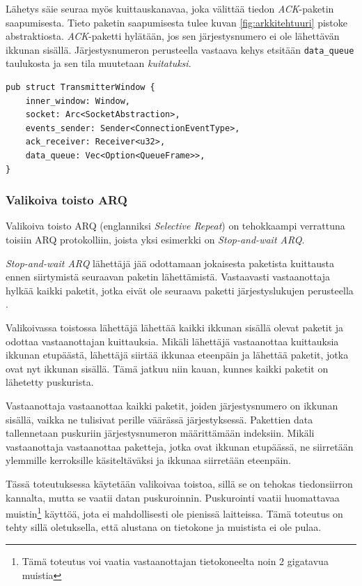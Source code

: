 \documentclass[a4paper,12pt]{article}
\begin{document}
Lähetys säie seuraa myös kuittauskanavaa, joka välittää tiedon \textit{ACK}-paketin saapumisesta. Tieto paketin saapumisesta tulee kuvan \ref{fig:arkkitehtuuri} pistoke abstraktiosta. \textit{ACK}-paketti hylätään, jos sen järjestysnumero ei ole lähettävän ikkunan sisällä. Järjestysnumeron perusteella vastaava kehys etsitään \lstinline{data_queue} taulukosta ja sen tila muutetaan \textit{kuitatuksi}. \par
    
    \begin{lstlisting}[caption={Lähettävän ikkunan rakenne}, label={lst:twindow}]
pub struct TransmitterWindow {
    inner_window: Window,
    socket: Arc<SocketAbstraction>,
    events_sender: Sender<ConnectionEventType>,
    ack_receiver: Receiver<u32>,
    data_queue: Vec<Option<QueueFrame>>,
}\end{lstlisting}

    \subsubsection{Valikoiva toisto ARQ}\label{subsec:valikoiva_toisto}
    Valikoiva toisto ARQ (englanniksi \textit{Selective Repeat}) on tehokkaampi verrattuna toisiin ARQ protokolliin, joista yksi esimerkki on \textit{Stop-and-wait ARQ}.

    \textit{Stop-and-wait ARQ} lähettäjä jää odottamaan jokaisesta paketista kuittausta ennen siirtymistä seuraavan paketin lähettämistä. Vastaavasti vastaanottaja hylkää kaikki paketit, jotka eivät ole seuraava paketti järjestyslukujen perusteella \cite{StopAndWaitARQ}.

    Valikoivassa toistossa lähettäjä lähettää kaikki ikkunan sisällä olevat paketit ja odottaa vastaanottajan kuittauksia. Mikäli lähettäjä vastaanottaa kuittauksia ikkunan etupäästä, lähettäjä siirtää ikkunaa eteenpäin ja lähettää paketit, jotka ovat nyt ikkunan sisällä. Tämä jatkuu niin kauan, kunnes kaikki paketit on lähetetty puskurista. \par

    Vastaanottaja vastaanottaa kaikki paketit, joiden järjestysnumero on ikkunan sisällä, vaikka ne tulisivat perille väärässä järjestyksessä. Pakettien data tallennetaan puskuriin järjestysnumeron määrittämään indeksiin. Mikäli vastaanottaja vastaanottaa paketteja, jotka ovat ikkunan etupäässä, ne siirretään ylemmille kerroksille käsiteltäväksi ja ikkunaa siirretään eteenpäin.

    Tässä toteutuksessa käytetään valikoivaa toistoa, sillä se on tehokas tiedonsiirron kannalta, mutta se vaatii datan puskuroinnin. Puskurointi vaatii huomattavaa muistin\footnote{Tämä toteutus voi vaatia vastaanottajan tietokoneelta noin 2 gigatavua muistia} käyttöä, jota ei mahdollisesti ole pienissä laitteissa. Tämä toteutus on tehty sillä oletuksella, että alustana on tietokone ja muistista ei ole pulaa.\par
\end{document}
